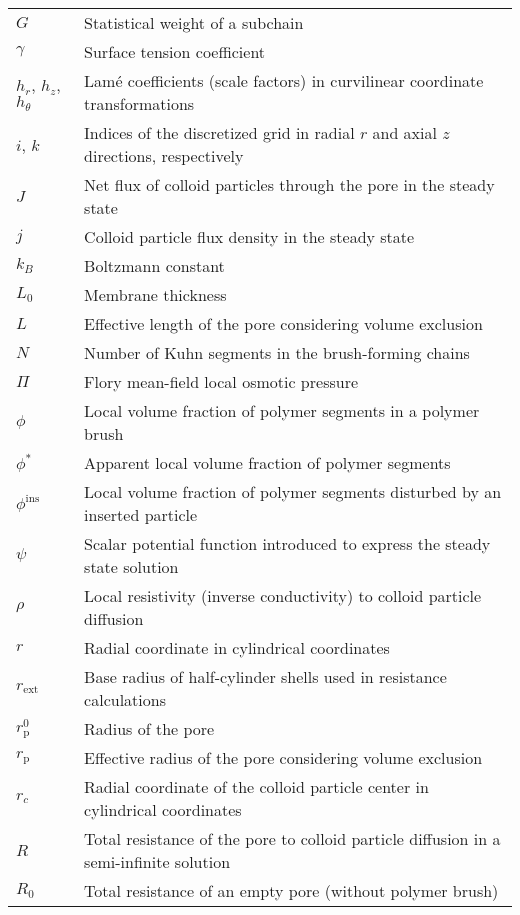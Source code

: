 \documentclass[10pt, a4paper, twocolumn]{article}
\begin{document}
\begin{tabularx}{\linewidth}{l X}
    $G$ & Statistical weight of a subchain \\
    $\gamma$ & Surface tension coefficient \\
    $h_{r}$, $h_{z}$, $h_{\theta}$ & Lam\'e coefficients (scale factors) in curvilinear coordinate transformations \\
    $i$, $k$ & Indices of the discretized grid in radial $r$ and axial $z$ directions, respectively \\
    $J$ & Net flux of colloid particles through the pore in the steady state \\
    $j$ & Colloid particle flux density in the steady state \\
    $k_B$ & Boltzmann constant \\
    $L_{0}$ & Membrane thickness \\
    $L$ & Effective length of the pore considering volume exclusion \\
    $N$ & Number of Kuhn segments in the brush-forming chains \\
    $\Pi$ & Flory mean-field local osmotic pressure \\
    $\phi$ & Local volume fraction of polymer segments in a polymer brush \\
    $\phi^{\ast}$ & Apparent local volume fraction of polymer segments \\
    $\phi^{\text{ins}}$ & Local volume fraction of polymer segments disturbed by an inserted particle \\
    $\psi$ & Scalar potential function introduced to express the steady state solution \\
    $\rho$ & Local resistivity (inverse conductivity) to colloid particle diffusion \\
    $r$ & Radial coordinate in cylindrical coordinates \\
    $r_{\text{ext}}$ & Base radius of half-cylinder shells used in resistance calculations\\
    $r_{\text{p}}^{0}$ & Radius of the pore \\
    $r_{\text{p}}$ & Effective radius of the pore considering volume exclusion \\
    $r_{c}$ & Radial coordinate of the colloid particle center in cylindrical coordinates \\
    $R$ & Total resistance of the pore to colloid particle diffusion in a semi-infinite solution \\
    $R_{0}$ & Total resistance of an empty pore (without polymer brush) \\

\end{tabularx}
\end{document}
